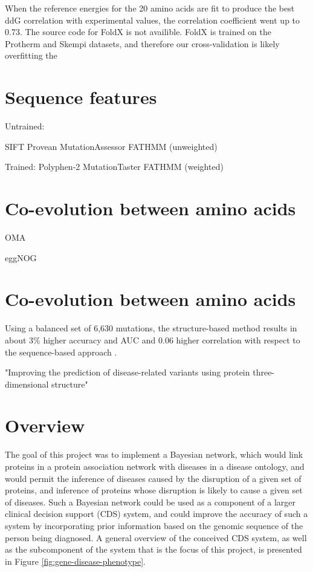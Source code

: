 \documentclass[11pt]{article}
\begin{document}
When the reference energies for the 20 amino acids are fit to produce the best ddG correlation with experimental values, the correlation coefficient went up to 0.73. 
The source code for FoldX is not availible. FoldX is trained on the Protherm and Skempi datasets, and therefore our cross-validation is likely overfitting the 



\section{Sequence features}

Untrained:

SIFT
Provean 
MutationAssessor
FATHMM (unweighted)


Trained:
Polyphen-2
MutationTaster
FATHMM (weighted)



\section{Co-evolution between amino acids}


OMA

eggNOG





\section{Co-evolution between amino acids}

Using a balanced set of 6,630 mutations, the structure-based method results in about 3\% higher accuracy and AUC and 0.06 higher correlation with respect to the sequence-based approach \cite{Capriotti2011}.

"Improving the prediction of disease-related variants using protein three-dimensional structure"


















\section*{Overview}

The goal of this project was to implement a Bayesian network, which would link proteins in a protein association network with diseases in a disease ontology, and would permit the inference of diseases caused by the disruption of a given set of proteins, and inference of proteins whose disruption is likely to cause a given set of diseases. Such a Bayesian network could be used as a component of a larger clinical decision support (CDS) system, and could improve the accuracy of such a system by incorporating prior information based on the genomic sequence of the person being diagnosed. A general overview of the conceived CDS system, as well as the subcomponent of the system that is the focus of this project, is presented in Figure \ref{fig:gene-disease-phenotype}. 
\end{document}
